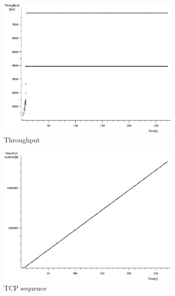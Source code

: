 \documentclass[conference,a4paper]{IEEEtran}
\begin{document}
\begin{figure}
 \centering
 \begin{subfigure}[b]{0.2\textwidth}
  \includegraphics[width=\textwidth]{s4-3_thru}
  \caption{Throughput}
 \end{subfigure}
 \begin{subfigure}[b]{0.2\textwidth}
  \includegraphics[width=\textwidth]{s4-3_seq}
  \caption{TCP sequence}
 \end{subfigure}
 \begin{subfigure}[b]{0.2\textwidth}

\end{subfigure}
\end{figure}
\end{document}
